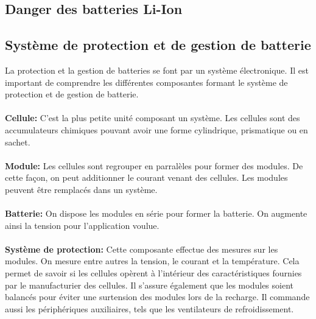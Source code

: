 		
		\subsection{Danger des batteries Li-Ion}
		
		\subsection{Système de protection et de gestion de batterie}
		
		La protection et la gestion de batteries se font par un système électronique. Il est important de comprendre les différentes composantes formant le système de protection et de gestion de batterie.
		
		\paragraph{}
		\textbf{Cellule:} C'est la plus petite unité composant un système. Les cellules sont des accumulateurs chimiques pouvant avoir une forme cylindrique, prismatique ou en sachet.  
		
		\paragraph{}
		\textbf{Module:} Les cellules sont regrouper en parralèles pour former des modules. De cette façon, on peut additionner le courant venant des cellules. Les modules peuvent être remplacés dans un système.
		
		\paragraph{}
		\textbf{Batterie:} On dispose les modules en série pour former la batterie. On augmente ainsi la tension pour l'application voulue.
		
		\paragraph{}
		\textbf{Système de protection:} Cette composante effectue des mesures sur les modules. On mesure entre autres la tension, le courant et la température. Cela permet de savoir si les cellules opèrent à l'intérieur des caractéristiques fournies par le manufacturier des cellules. Il s'assure également que les modules soient balancés pour éviter une surtension des modules lors de la recharge. Il commande aussi les périphériques auxiliaires, tels que les ventilateurs de refroidissement.
		
